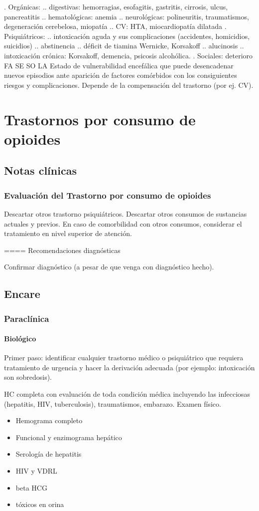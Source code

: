 \documentclass{scrbook}
\begin{document}
. Orgánicas:
.. digestivas: hemorragias, esofagitis, gastritis, cirrosis, ulcus, pancreatitis
.. hematológicas: anemia
.. neurológicas: polineuritis, traumatismos, degeneración cerebelosa, miopatía
.. CV: HTA, miocardiopatía dilatada
. Psiquiátricos:
.. intoxicación aguda y sus complicaciones (accidentes, homicidios, suicidios)
.. abstinencia
.. déficit de tiamina Wernicke, Korsakoff
.. alucinosis
.. intoxicación crónica: Korsakoff, demencia, psicosis alcohólica.
. Sociales: deterioro FA SE SO LA Estado de vulnerabilidad encefálica que puede desencadenar nuevos episodios ante aparición de factores comórbidos con los consiguientes riesgos y complicaciones. Depende de la compensación del trastorno (por ej. CV).
\printbibliography[]
\chapter{Trastornos por consumo de opioides}
\section*{Notas clínicas}
\subsection*{Evaluación del Trastorno por consumo de opioides}

Descartar otros trastorno psiquiátricos.
Descartar otros consumos de sustancias actuales y previos.
En caso de comorbilidad con otros consumos, considerar el tratamiento en nivel superior de atención.

==== Recomendaciones diagnósticas

Confirmar diagnóstico (a pesar de que venga con diagnóstico hecho).

\section*{Encare}
\subsection*{Paraclínica}
\subsubsection{Biológico}
Primer paso: identificar cualquier trastorno médico o psiquiátrico que requiera tratamiento de urgencia y hacer la derivación adecuada (por ejemplo: intoxicación son sobredosis).

HC completa con evaluación de toda condición médica incluyendo las infecciosas (hepatitis, HIV, tuberculosis), traumatismos, embarazo. Examen físico.
\begin{itemize}
	\item Hemograma completo
	\item Funcional y enzimograma hepático
	\item Serología de hepatitis
	\item HIV y VDRL
	\item beta HCG
	\item tóxicos en orina
\end{itemize}
\end{document}
